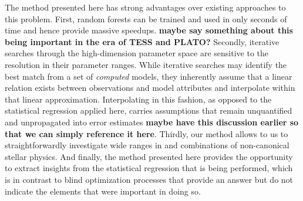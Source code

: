 \documentclass[manuscript]{aastex}
\begin{document}
The method presented here has strong advantages over existing approaches to this problem. First, random forests can be trained and used in only seconds of time and hence provide massive speedups. \textbf{maybe say something about this being important in the era of TESS and PLATO?} Secondly, iterative searches through the high-dimension parameter space are sensitive to the resolution in their parameter ranges. While iterative searches may identify the best match from a set of \emph{computed} models, they inherently assume that a linear relation exists between observations and model attributes and interpolate within that linear approximation. Interpolating in this fashion, as opposed to the statistical regression applied here, carries assumptions that remain unquantified and unpropagated into error estimates \textbf{maybe have this discussion earlier so that we can simply reference it here}. Thirdly, our method allows to us to straightforwardly investigate wide ranges in and combinations of non-canonical stellar physics. And finally, the method presented here provides the opportunity to extract insights from the statistical regression that is being performed, which is in contrast to blind optimization processes that provide an answer but do not indicate the elements that were important in doing so. %





\end{document}
